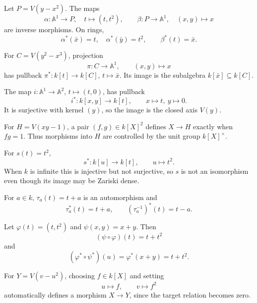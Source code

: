
\begin{example}
Let \(P=V(y-x^2)\).  The maps
\[
\alpha:\mathbb A^1\to P,\quad t\mapsto(t,t^2),
\qquad
\beta:P\to\mathbb A^1,\quad(x,y)\mapsto x
\]
are inverse morphisms.  On rings,
\[
\alpha^*(\bar x)=t,\quad \alpha^*(\bar y)=t^2,
\qquad \beta^*(t)=\bar x.
\]
\end{example}

\begin{example}
For \(C=V(y^2-x^3)\), projection
\[
\pi:C\to\mathbb A^1,\qquad(x,y)\mapsto x
\]
has pullback \(\pi^*:k[t]\to k[C]\), \(t\mapsto\bar x\).  Its image is the subalgebra
\(k[\bar x]\subseteq k[C]\).
\end{example}

\begin{example}
The map \(i:\mathbb A^1\to\mathbb A^2\), \(t\mapsto(t,0)\), has pullback
\[
i^*:k[x,y]\to k[t],\qquad x\mapsto t,\ y\mapsto0.
\]
It is surjective with kernel \((y)\), so the image is the closed axis \(V(y)\).
\end{example}

\begin{example}
For \(H=V(xy-1)\), a pair \((f,g)\in k[X]^2\) defines \(X\to H\) exactly when
\(fg=1\).  Thus morphisms into \(H\) are controlled by the unit group \(k[X]^\times\).
\end{example}

\begin{example}
For \(s(t)=t^2\),
\[
s^*:k[u]\to k[t],\qquad u\mapsto t^2.
\]
When \(k\) is infinite this is injective but not surjective, so \(s\) is not an
isomorphism even though its image may be Zariski dense.
\end{example}

\begin{example}[Translation]
For \(a\in k\), \(\tau_a(t)=t+a\) is an automorphism and
\[
\tau_a^*(t)=t+a,
\qquad
(\tau_a^{-1})^*(t)=t-a.
\]
\end{example}

\begin{example}
Let \(\varphi(t)=(t,t^2)\) and \(\psi(x,y)=x+y\).  Then
\[
(\psi\circ\varphi)(t)=t+t^2
\]
and
\[
(\varphi^*\circ\psi^*)(u)=\varphi^*(x+y)=t+t^2.
\]
\end{example}

\begin{example}
For \(Y=V(v-u^2)\), choosing \(f\in k[X]\) and setting
\[
u\mapsto f,\qquad v\mapsto f^2
\]
automatically defines a morphism \(X\to Y\), since the target relation becomes zero.
\end{example}

